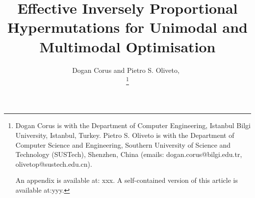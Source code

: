 \documentclass[lettersize,journal]{IEEEtran}
\begin{document}
\title{Effective Inversely Proportional Hypermutations for Unimodal and Multimodal Optimisation}

%
%

%        
\author{Dogan Corus	 and Pietro S. Oliveto,~

\thanks{
Dogan Corus is with the Department of Computer Engineering, Istanbul Bilgi University, Istanbul, Turkey. 
Pietro S. Oliveto is with the Department of Computer Science and Engineering, Southern University of Science and Technology (SUSTech), Shenzhen, China
(emails: dogan.corus@bilgi.edu.tr, olivetop@sustech.edu.cn). 

An appendix is available at: xxx. A self-contained version of this article is available at:yyy.
}

}




\maketitle
\end{document}
